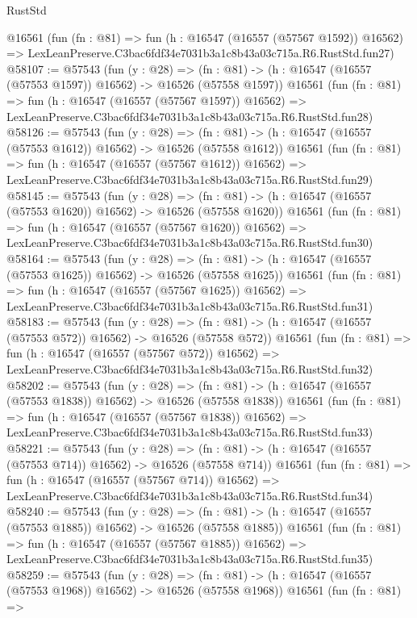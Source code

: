 \begin{lexlean}{RustStd}
\begin{coremodule}
    @16561
    (fun (fn : @81) =>
    fun (h : @16547 (@16557 (@57567 @1592)) @16562) =>
    LexLeanPreserve.C3bac6fdf34e7031b3a1c8b43a03c715a.R6.RustStd.fun27)
@58107 := @57543
    (fun (y : @28) =>
    (fn : @81) -> (h : @16547 (@16557 (@57553 @1597)) @16562) -> @16526 (@57558 @1597))
    @16561
    (fun (fn : @81) =>
    fun (h : @16547 (@16557 (@57567 @1597)) @16562) =>
    LexLeanPreserve.C3bac6fdf34e7031b3a1c8b43a03c715a.R6.RustStd.fun28)
@58126 := @57543
    (fun (y : @28) =>
    (fn : @81) -> (h : @16547 (@16557 (@57553 @1612)) @16562) -> @16526 (@57558 @1612))
    @16561
    (fun (fn : @81) =>
    fun (h : @16547 (@16557 (@57567 @1612)) @16562) =>
    LexLeanPreserve.C3bac6fdf34e7031b3a1c8b43a03c715a.R6.RustStd.fun29)
@58145 := @57543
    (fun (y : @28) =>
    (fn : @81) -> (h : @16547 (@16557 (@57553 @1620)) @16562) -> @16526 (@57558 @1620))
    @16561
    (fun (fn : @81) =>
    fun (h : @16547 (@16557 (@57567 @1620)) @16562) =>
    LexLeanPreserve.C3bac6fdf34e7031b3a1c8b43a03c715a.R6.RustStd.fun30)
@58164 := @57543
    (fun (y : @28) =>
    (fn : @81) -> (h : @16547 (@16557 (@57553 @1625)) @16562) -> @16526 (@57558 @1625))
    @16561
    (fun (fn : @81) =>
    fun (h : @16547 (@16557 (@57567 @1625)) @16562) =>
    LexLeanPreserve.C3bac6fdf34e7031b3a1c8b43a03c715a.R6.RustStd.fun31)
@58183 := @57543
    (fun (y : @28) =>
    (fn : @81) -> (h : @16547 (@16557 (@57553 @572)) @16562) -> @16526 (@57558 @572))
    @16561
    (fun (fn : @81) =>
    fun (h : @16547 (@16557 (@57567 @572)) @16562) =>
    LexLeanPreserve.C3bac6fdf34e7031b3a1c8b43a03c715a.R6.RustStd.fun32)
@58202 := @57543
    (fun (y : @28) =>
    (fn : @81) -> (h : @16547 (@16557 (@57553 @1838)) @16562) -> @16526 (@57558 @1838))
    @16561
    (fun (fn : @81) =>
    fun (h : @16547 (@16557 (@57567 @1838)) @16562) =>
    LexLeanPreserve.C3bac6fdf34e7031b3a1c8b43a03c715a.R6.RustStd.fun33)
@58221 := @57543
    (fun (y : @28) =>
    (fn : @81) -> (h : @16547 (@16557 (@57553 @714)) @16562) -> @16526 (@57558 @714))
    @16561
    (fun (fn : @81) =>
    fun (h : @16547 (@16557 (@57567 @714)) @16562) =>
    LexLeanPreserve.C3bac6fdf34e7031b3a1c8b43a03c715a.R6.RustStd.fun34)
@58240 := @57543
    (fun (y : @28) =>
    (fn : @81) -> (h : @16547 (@16557 (@57553 @1885)) @16562) -> @16526 (@57558 @1885))
    @16561
    (fun (fn : @81) =>
    fun (h : @16547 (@16557 (@57567 @1885)) @16562) =>
    LexLeanPreserve.C3bac6fdf34e7031b3a1c8b43a03c715a.R6.RustStd.fun35)
@58259 := @57543
    (fun (y : @28) =>
    (fn : @81) -> (h : @16547 (@16557 (@57553 @1968)) @16562) -> @16526 (@57558 @1968))
    @16561
    (fun (fn : @81) =>

\end{coremodule}
\end{lexlean}
